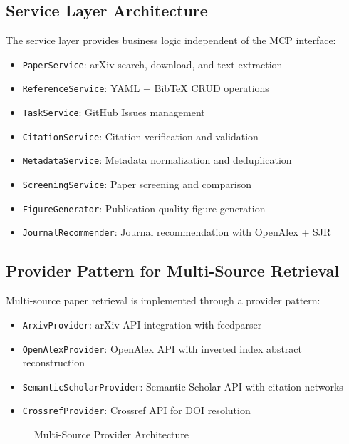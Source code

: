 \documentclass{article}
\begin{document}
\subsection{Service Layer Architecture}

The service layer provides business logic independent of the MCP interface:

\begin{itemize}
    \item \texttt{PaperService}: arXiv search, download, and text extraction
    \item \texttt{ReferenceService}: YAML + BibTeX CRUD operations
    \item \texttt{TaskService}: GitHub Issues management
    \item \texttt{CitationService}: Citation verification and validation
    \item \texttt{MetadataService}: Metadata normalization and deduplication
    \item \texttt{ScreeningService}: Paper screening and comparison
    \item \texttt{FigureGenerator}: Publication-quality figure generation
    \item \texttt{JournalRecommender}: Journal recommendation with OpenAlex + SJR
\end{itemize}

\subsection{Provider Pattern for Multi-Source Retrieval}

Multi-source paper retrieval is implemented through a provider pattern:

\begin{itemize}
    \item \texttt{ArxivProvider}: arXiv API integration with feedparser
    \item \texttt{OpenAlexProvider}: OpenAlex API with inverted index abstract reconstruction
    \item \texttt{SemanticScholarProvider}: Semantic Scholar API with citation networks
    \item \texttt{CrossrefProvider}: Crossref API for DOI resolution
\end{itemize}

\begin{figure}[h]
\centering
{}
\caption{Multi-Source Provider Architecture}
\label{fig:providers}
\end{figure}
\end{document}
